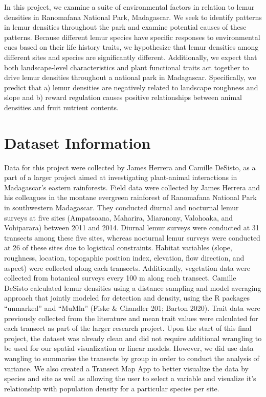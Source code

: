 \documentclass[
  12pt,
]{article}
\begin{document}
In this project, we examine a suite of environmental factors in relation
to lemur densities in Ranomafana National Park, Madagascar. We seek to
identify patterns in lemur densities throughout the park and examine
potential causes of these patterns. Because different lemur species have
specific responses to environmental cues based on their life history
traits, we hypothesize that lemur densities among different sites and
species are significantly different. Additionally, we expect that both
landscape-level characteristics and plant functional traits act together
to drive lemur densities throughout a national park in Madagascar.
Specifically, we predict that a) lemur densities are negatively related
to landscape roughness and slope and b) reward regulation causes
positive relationships between animal densities and fruit nutrient
contents.

\newpage

\hypertarget{dataset-information}{%
\section{Dataset Information}\label{dataset-information}}

Data for this project were collected by James Herrera and Camille
DeSisto, as a part of a larger project aimed at investigating
plant-animal interactions in Madagascar's eastern rainforests. Field
data were collected by James Herrera and his colleagues in the montane
evergreen rainforest of Ranomafana National Park in southwestern
Madagascar. They conducted diurnal and nocturnal lemur surveys at five
sites (Ampatsoana, Maharira, Miaranony, Valohoaka, and Vohiparara)
between 2011 and 2014. Diurnal lemur surveys were conducted at 31
transects among these five sites, whereas nocturnal lemur surveys were
conducted at 26 of these sites due to logistical constraints. Habitat
variables (slope, roughness, location, topogaphic position index,
elevation, flow direction, and aspect) were collected along each
transects. Additionally, vegetation data were collected from botanical
surveys every 100 m along each transect. Camille DeSisto calculated
lemur densities using a distance sampling and model averaging approach
that jointly modeled for detection and density, using the R packages
``unmarked'' and ``MuMln'' (Fiske \& Chandler 201; Barton 2020). Trait
data were previously collected from the literature and mean trait values
were calculated for each transect as part of the larger research
project. Upon the start of this final project, the dataset was already
clean and did not require additional wrangling to be used for our
spatial visualization or linear models. However, we did use data
wangling to summarise the transects by group in order to conduct the
analysis of variance. We also created a Transect Map App to better
visualize the data by species and site as well as allowing the user to
select a variable and visualize it's relationship with population
density for a particular species per site.
\end{document}
